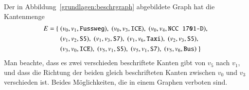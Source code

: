 Der in Abbildung~\ref{grundlagen:beschrgraph} abgebildete Graph
hat die Kantenmenge 
\begin{align*}
E=\{\;
&
(v_0,v_1,\text{\tt Fussweg}),\;
(v_0,v_3,\text{\tt ICE}),\;
(v_0,v_4,\text{\tt NCC 1701-D}),\;
\\&
(v_1,v_2,\text{\tt S5}),\;
(v_1,v_3,\text{\tt S7}),\;
(v_1,v_6,\text{\tt Taxi}),\;
(v_2,v_3,\text{\tt S5}),\;
\\&
(v_3,v_0,\text{\tt ICE}),\;
(v_5,v_1,\text{\tt S5}),\;
(v_5,v_1,\text{\tt S7}),\;
(v_5,v_6,\text{\tt Bus})\;
\}
\end{align*}
Man beachte, dass es zwei verschieden beschriftete Kanten gibt
von $v_5$ nach $v_1$, und dass die Richtung der beiden gleich
beschrifteten Kanten zwischen $v_0$ und $v_3$ verschieden ist.
Beides Möglichkeiten, die in einem Graphen verboten sind.
